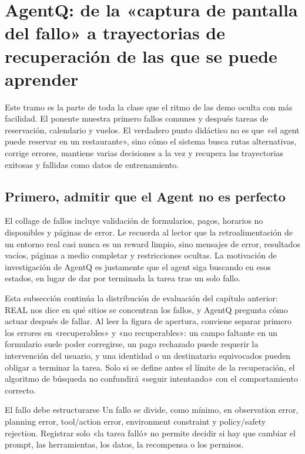 \section{AgentQ: de la «captura de pantalla del fallo» a trayectorias de recuperación de las que se puede aprender}

Este tramo es la parte de toda la clase que el ritmo de las demo oculta con más facilidad. El ponente muestra primero fallos comunes y después tareas de reservación, calendario y vuelos. El verdadero punto didáctico no es que «el agent puede reservar en un restaurante», sino cómo el sistema busca rutas alternativas, corrige errores, mantiene varias decisiones a la vez y recupera las trayectorias exitosas y fallidas como datos de entrenamiento.

\subsection{Primero, admitir que el Agent no es perfecto}

El collage de fallos incluye validación de formularios, pagos, horarios no disponibles y páginas de error. Le recuerda al lector que la retroalimentación de un entorno real casi nunca es un reward limpio, sino mensajes de error, resultados vacíos, páginas a medio completar y restricciones ocultas. La motivación de investigación de AgentQ es justamente que el agent siga buscando en esos estados, en lugar de dar por terminada la tarea tras un solo fallo.

Esta subsección continúa la distribución de evaluación del capítulo anterior: REAL nos dice en qué sitios se concentran los fallos, y AgentQ pregunta cómo actuar después de fallar. Al leer la figura de apertura, conviene separar primero los errores en «recuperables» y «no recuperables»: un campo faltante en un formulario suele poder corregirse, un pago rechazado puede requerir la intervención del usuario, y una identidad o un destinatario equivocados pueden obligar a terminar la tarea. Solo si se define antes el límite de la recuperación, el algoritmo de búsqueda no confundirá «seguir intentando» con el comportamiento correcto.



\begin{importantbox}{El fallo debe estructurarse}
Un fallo se divide, como mínimo, en observation error, planning error, tool/action error, environment constraint y policy/safety rejection. Registrar solo «la tarea falló» no permite decidir si hay que cambiar el prompt, las herramientas, los datos, la recompensa o los permisos.
\end{importantbox}


